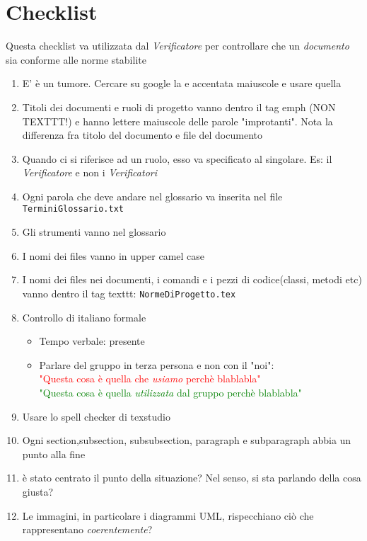 \section{Checklist}
Questa checklist va utilizzata dal \emph{Verificatore} per controllare che un \emph{documento} sia conforme alle norme stabilite

\begin{enumerate}
	\item E' è un tumore. Cercare su google la e accentata maiuscole e usare quella
	\item Titoli dei documenti e ruoli di progetto vanno dentro il tag emph (NON TEXTTT!) e hanno lettere maiuscole delle parole "improtanti". Nota la differenza fra titolo del documento e file del documento
	\item Quando ci si riferisce ad un ruolo, esso va specificato al singolare. Es: il \emph{Verificatore} e non i \emph{Verificatori}
	\item Ogni parola che deve andare nel glossario va inserita nel file \texttt{TerminiGlossario.txt}
	\item Gli strumenti vanno nel glossario
	\item I nomi dei files vanno in upper camel case
	\item I nomi dei files nei documenti, i comandi e i pezzi di codice(classi, metodi etc) vanno dentro il tag texttt: \texttt{NormeDiProgetto.tex}
	\item Controllo di italiano formale
	\begin{itemize}
		\item Tempo verbale: presente
		\item Parlare del gruppo in terza persona e non con il "noi":\\ \textcolor{red}{"Questa cosa è quella che \emph{usiamo} perchè blablabla"}\\
		\textcolor{green}{"Questa cosa è quella \emph{utilizzata} dal gruppo perchè blablabla"}
	\end{itemize}
	\item Usare lo spell checker di texstudio
	\item Ogni section,subsection, subsubsection, paragraph e subparagraph abbia un punto alla fine
	\item è stato centrato il punto della situazione? Nel senso, si sta parlando della cosa giusta?
	\item Le immagini, in particolare i diagrammi UML, rispecchiano ciò che rappresentano \emph{coerentemente}?
\end{enumerate}